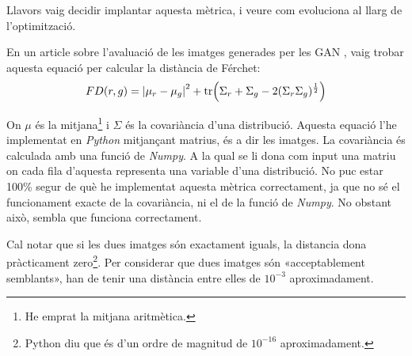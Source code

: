 Llavors vaig decidir implantar aquesta mètrica, i veure com evoluciona al llarg de l'optimització. 

En un article sobre l'avaluació de les imatges generades per les GAN \cite{sd_score}, vaig trobar aquesta equació per calcular la distància de Férchet:
$$
FD(r, g) = \abs{\mu_r - \mu_g}^2 + \tr(\Sigma_r + \Sigma_g -2(\Sigma_r\Sigma_g)^{\frac{1}{2}})
$$

On $\mu$ és la mitjana\footnote{He emprat la mitjana aritmètica.} i $\Sigma$ és la covariància d'una distribució. Aquesta equació l'he implementat en \textit{Python} mitjançant matrius, és a dir les imatges. La covariància és calculada amb una funció de \textit{Numpy}. A la qual se li dona com input una matriu on cada fila d'aquesta representa una variable d'una distribució. No puc estar 100\% segur de què he implementat aquesta mètrica correctament, ja que no sé el funcionament exacte de la covariància, ni el de la funció de \textit{Numpy}. No obstant això, sembla que funciona correctament.

Cal notar que si les dues imatges són exactament iguals, la distancia dona pràcticament zero\footnote{Python diu que és d'un ordre de magnitud de $10^{-16}$ aproximadament.}. Per considerar que dues imatges són «acceptablement semblants», han de tenir una distància entre elles de $10^{-3}$ aproximadament.